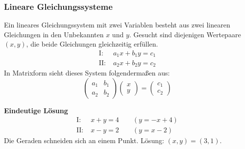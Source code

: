 \subsubsection{Lineare Gleichungssysteme}
Ein lineares Gleichungssystem mit zwei Variablen besteht aus zwei linearen Gleichungen in den Unbekannten \(x\) und \(y\). Gesucht sind diejenigen Wertepaare \((x,y)\), die beide Gleichungen gleichzeitig erfüllen.  
\begin{align}  
    \text{I:}\;  &a_1 x + b_1 y = c_1  \\
    \text{II:}\; &a_2 x + b_2 y = c_2  \nonumber
\end{align}  
In Matrixform sieht dieses System folgendermaßen aus:
\begin{equation}
    \begin{pmatrix}  
        a_1 & b_1 \\  
        a_2 & b_2  
    \end{pmatrix}  
    \begin{pmatrix}  
        x \\  
        y  
    \end{pmatrix}  
    =  
    \begin{pmatrix}  
        c_1 \\  
        c_2  
    \end{pmatrix}
\end{equation}

\vspace{1em}  

\noindent  
\begin{minipage}{0.5\textwidth}  
\textbf{Eindeutige Lösung}  
\begin{align*}
    \text{I:}\; &x + y = 4 \qquad (y=-x+4) \\
    \text{II:}\; &x - y = 2 \qquad (y=x-2) 
\end{align*}
Die Geraden schneiden sich an einem Punkt.
Lösung: \((x,y) = (3,1)\).  
\end{minipage}  
\hfill  
\begin{minipage}{0.45\textwidth}  
\centering  
{}  
\end{minipage}  
\\
\vspace{2em}  
  
